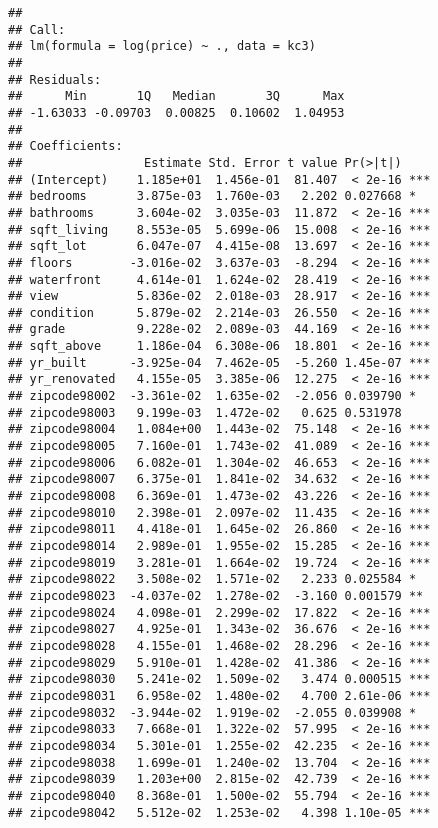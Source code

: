 \documentclass[]{article}
\begin{document}
\begin{verbatim}
## 
## Call:
## lm(formula = log(price) ~ ., data = kc3)
## 
## Residuals:
##      Min       1Q   Median       3Q      Max 
## -1.63033 -0.09703  0.00825  0.10602  1.04953 
## 
## Coefficients:
##                 Estimate Std. Error t value Pr(>|t|)    
## (Intercept)    1.185e+01  1.456e-01  81.407  < 2e-16 ***
## bedrooms       3.875e-03  1.760e-03   2.202 0.027668 *  
## bathrooms      3.604e-02  3.035e-03  11.872  < 2e-16 ***
## sqft_living    8.553e-05  5.699e-06  15.008  < 2e-16 ***
## sqft_lot       6.047e-07  4.415e-08  13.697  < 2e-16 ***
## floors        -3.016e-02  3.637e-03  -8.294  < 2e-16 ***
## waterfront     4.614e-01  1.624e-02  28.419  < 2e-16 ***
## view           5.836e-02  2.018e-03  28.917  < 2e-16 ***
## condition      5.879e-02  2.214e-03  26.550  < 2e-16 ***
## grade          9.228e-02  2.089e-03  44.169  < 2e-16 ***
## sqft_above     1.186e-04  6.308e-06  18.801  < 2e-16 ***
## yr_built      -3.925e-04  7.462e-05  -5.260 1.45e-07 ***
## yr_renovated   4.155e-05  3.385e-06  12.275  < 2e-16 ***
## zipcode98002  -3.361e-02  1.635e-02  -2.056 0.039790 *  
## zipcode98003   9.199e-03  1.472e-02   0.625 0.531978    
## zipcode98004   1.084e+00  1.443e-02  75.148  < 2e-16 ***
## zipcode98005   7.160e-01  1.743e-02  41.089  < 2e-16 ***
## zipcode98006   6.082e-01  1.304e-02  46.653  < 2e-16 ***
## zipcode98007   6.375e-01  1.841e-02  34.632  < 2e-16 ***
## zipcode98008   6.369e-01  1.473e-02  43.226  < 2e-16 ***
## zipcode98010   2.398e-01  2.097e-02  11.435  < 2e-16 ***
## zipcode98011   4.418e-01  1.645e-02  26.860  < 2e-16 ***
## zipcode98014   2.989e-01  1.955e-02  15.285  < 2e-16 ***
## zipcode98019   3.281e-01  1.664e-02  19.724  < 2e-16 ***
## zipcode98022   3.508e-02  1.571e-02   2.233 0.025584 *  
## zipcode98023  -4.037e-02  1.278e-02  -3.160 0.001579 ** 
## zipcode98024   4.098e-01  2.299e-02  17.822  < 2e-16 ***
## zipcode98027   4.925e-01  1.343e-02  36.676  < 2e-16 ***
## zipcode98028   4.155e-01  1.468e-02  28.296  < 2e-16 ***
## zipcode98029   5.910e-01  1.428e-02  41.386  < 2e-16 ***
## zipcode98030   5.241e-02  1.509e-02   3.474 0.000515 ***
## zipcode98031   6.958e-02  1.480e-02   4.700 2.61e-06 ***
## zipcode98032  -3.944e-02  1.919e-02  -2.055 0.039908 *  
## zipcode98033   7.668e-01  1.322e-02  57.995  < 2e-16 ***
## zipcode98034   5.301e-01  1.255e-02  42.235  < 2e-16 ***
## zipcode98038   1.699e-01  1.240e-02  13.704  < 2e-16 ***
## zipcode98039   1.203e+00  2.815e-02  42.739  < 2e-16 ***
## zipcode98040   8.368e-01  1.500e-02  55.794  < 2e-16 ***
## zipcode98042   5.512e-02  1.253e-02   4.398 1.10e-05 ***

\end{verbatim}
\end{document}
